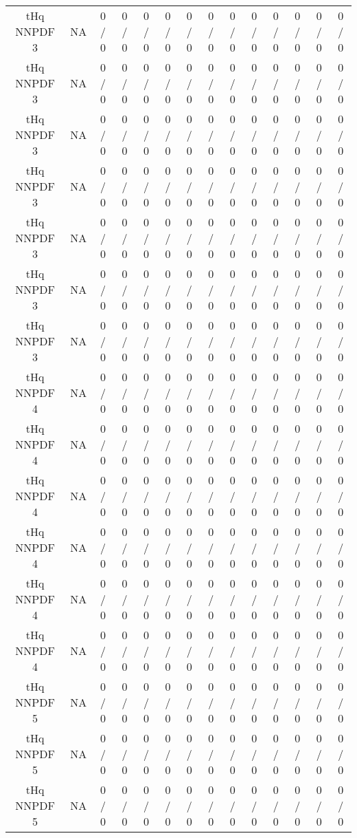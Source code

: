 \documentclass[10pt]{article}
\begin{document}
\begin{table}[htbp]
\begin{center}
\begin{tabular}{|c|c|c|c|c|c|c|c|c|c|c|c|c|c|}
  tHq NNPDF 3 &    NA    & 0 / 0 & 0 / 0 & 0 / 0 & 0 / 0 & 0 / 0 & 0 / 0 & 0 / 0 & 0 / 0 & 0 / 0 & 0 / 0 & 0 / 0 & 0 / 0 \\ 
  tHq NNPDF 3 &    NA    & 0 / 0 & 0 / 0 & 0 / 0 & 0 / 0 & 0 / 0 & 0 / 0 & 0 / 0 & 0 / 0 & 0 / 0 & 0 / 0 & 0 / 0 & 0 / 0 \\ 
  tHq NNPDF 3 &    NA    & 0 / 0 & 0 / 0 & 0 / 0 & 0 / 0 & 0 / 0 & 0 / 0 & 0 / 0 & 0 / 0 & 0 / 0 & 0 / 0 & 0 / 0 & 0 / 0 \\ 
  tHq NNPDF 3 &    NA    & 0 / 0 & 0 / 0 & 0 / 0 & 0 / 0 & 0 / 0 & 0 / 0 & 0 / 0 & 0 / 0 & 0 / 0 & 0 / 0 & 0 / 0 & 0 / 0 \\ 
  tHq NNPDF 3 &    NA    & 0 / 0 & 0 / 0 & 0 / 0 & 0 / 0 & 0 / 0 & 0 / 0 & 0 / 0 & 0 / 0 & 0 / 0 & 0 / 0 & 0 / 0 & 0 / 0 \\ 
  tHq NNPDF 3 &    NA    & 0 / 0 & 0 / 0 & 0 / 0 & 0 / 0 & 0 / 0 & 0 / 0 & 0 / 0 & 0 / 0 & 0 / 0 & 0 / 0 & 0 / 0 & 0 / 0 \\ 
  tHq NNPDF 3 &    NA    & 0 / 0 & 0 / 0 & 0 / 0 & 0 / 0 & 0 / 0 & 0 / 0 & 0 / 0 & 0 / 0 & 0 / 0 & 0 / 0 & 0 / 0 & 0 / 0 \\ 
  tHq NNPDF 4 &    NA    & 0 / 0 & 0 / 0 & 0 / 0 & 0 / 0 & 0 / 0 & 0 / 0 & 0 / 0 & 0 / 0 & 0 / 0 & 0 / 0 & 0 / 0 & 0 / 0 \\ 
  tHq NNPDF 4 &    NA    & 0 / 0 & 0 / 0 & 0 / 0 & 0 / 0 & 0 / 0 & 0 / 0 & 0 / 0 & 0 / 0 & 0 / 0 & 0 / 0 & 0 / 0 & 0 / 0 \\ 
  tHq NNPDF 4 &    NA    & 0 / 0 & 0 / 0 & 0 / 0 & 0 / 0 & 0 / 0 & 0 / 0 & 0 / 0 & 0 / 0 & 0 / 0 & 0 / 0 & 0 / 0 & 0 / 0 \\ 
  tHq NNPDF 4 &    NA    & 0 / 0 & 0 / 0 & 0 / 0 & 0 / 0 & 0 / 0 & 0 / 0 & 0 / 0 & 0 / 0 & 0 / 0 & 0 / 0 & 0 / 0 & 0 / 0 \\ 
  tHq NNPDF 4 &    NA    & 0 / 0 & 0 / 0 & 0 / 0 & 0 / 0 & 0 / 0 & 0 / 0 & 0 / 0 & 0 / 0 & 0 / 0 & 0 / 0 & 0 / 0 & 0 / 0 \\ 
  tHq NNPDF 4 &    NA    & 0 / 0 & 0 / 0 & 0 / 0 & 0 / 0 & 0 / 0 & 0 / 0 & 0 / 0 & 0 / 0 & 0 / 0 & 0 / 0 & 0 / 0 & 0 / 0 \\ 
  tHq NNPDF 5 &    NA    & 0 / 0 & 0 / 0 & 0 / 0 & 0 / 0 & 0 / 0 & 0 / 0 & 0 / 0 & 0 / 0 & 0 / 0 & 0 / 0 & 0 / 0 & 0 / 0 \\ 
  tHq NNPDF 5 &    NA    & 0 / 0 & 0 / 0 & 0 / 0 & 0 / 0 & 0 / 0 & 0 / 0 & 0 / 0 & 0 / 0 & 0 / 0 & 0 / 0 & 0 / 0 & 0 / 0 \\ 
  tHq NNPDF 5 &    NA    & 0 / 0 & 0 / 0 & 0 / 0 & 0 / 0 & 0 / 0 & 0 / 0 & 0 / 0 & 0 / 0 & 0 / 0 & 0 / 0 & 0 / 0 & 0 / 0 \\ 

\end{tabular}
\end{center}
\end{table}
\end{document}
